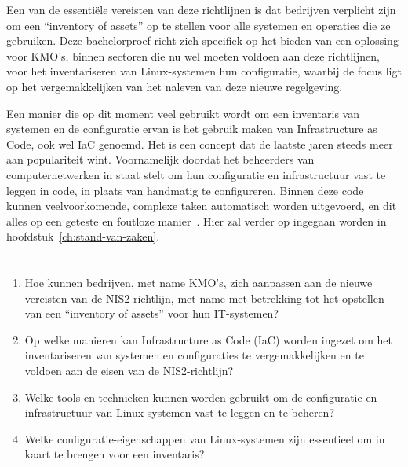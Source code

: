 Een van de essenti\"ele vereisten van deze richtlijnen is dat bedrijven verplicht zijn om een ``inventory of assets'' op te stellen voor alle systemen en operaties die ze gebruiken.
Deze bachelorproef richt zich specifiek op het bieden van een oplossing voor KMO's, binnen sectoren die nu wel moeten voldoen aan deze richtlijnen, voor het inventariseren van Linux-systemen hun configuratie, waarbij de focus ligt op het vergemakkelijken van het naleven van deze nieuwe regelgeving.

Een manier die op dit moment veel gebruikt wordt om een inventaris van systemen en de configuratie ervan is het gebruik maken van Infrastructure as Code, ook wel IaC genoemd.
Het is een concept dat de laatste jaren steeds meer aan populariteit wint. Voornamelijk doordat het beheerders van computernetwerken in staat stelt om hun configuratie en infrastructuur vast te leggen in code, in plaats van handmatig te configureren.
Binnen deze code kunnen veelvoorkomende, complexe taken automatisch worden uitgevoerd, en dit alles op een geteste en foutloze manier~\autocite{chef-what-is-iac}.
Hier zal verder op ingegaan worden in hoofdstuk~\ref{ch:stand-van-zaken}.

\section{}%
\label{sec:onderzoeksvraag}

\begin{enumerate}
    \item Hoe kunnen bedrijven, met name KMO's, zich aanpassen aan de nieuwe vereisten van de NIS2-richtlijn, met name met betrekking tot het opstellen van een ``inventory of assets'' voor hun IT-systemen?
    \item Op welke manieren kan Infrastructure as Code (IaC) worden ingezet om het inventariseren van systemen en configuraties te vergemakkelijken en te voldoen aan de eisen van de NIS2-richtlijn?
    \item Welke tools en technieken kunnen worden gebruikt om de configuratie en infrastructuur van Linux-systemen vast te leggen en te beheren?
    \item Welke configuratie-eigenschappen van Linux-systemen zijn essentieel om in kaart te brengen voor een inventaris?
\end{enumerate}

\section{}%
\label{sec:onderzoeksdoelstelling}

